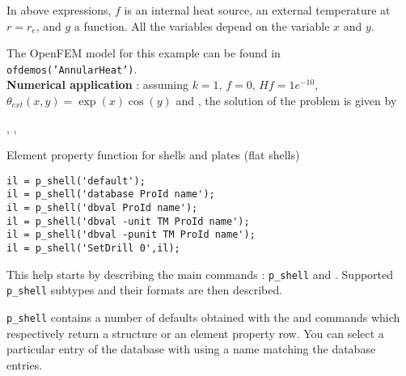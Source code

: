 In above expressions, $f$ is an internal heat source,  an external temperature at $r=r_e$, and $g$ a function. All the variables depend on the variable $x$ and $y$. 

The OpenFEM model for this example can be found in {\tt ofdemos('AnnularHeat')}.\\
{\bf Numerical application} : assuming $k=1$, $f=0$, $Hf=1e^{-10}$, $\theta_{ext}(x,y) = \exp(x) \cos(y)$ and , the solution of the problem is  given by




  , , \femat 


\begin{latexonly}
\end{latexonly}



Element property function for shells and plates (flat shells)

\rsyntax\begin{verbatim}
il = p_shell('default');
il = p_shell('database ProId name'); 
il = p_shell('dbval ProId name');
il = p_shell('dbval -unit TM ProId name');
il = p_shell('dbval -punit TM ProId name');
il = p_shell('SetDrill 0',il);
\end{verbatim}


This help starts by describing the main commands : {\tt p\_shell}  and . Supported {\tt p\_shell} subtypes and their formats are then described.



{\tt p\_shell} contains a number of defaults obtained with the  and  commands which respectively return a structure or an element property row. You can select a particular entry of the database with using a name matching the database entries. 


